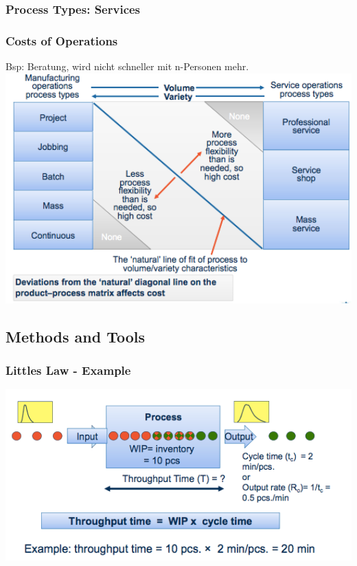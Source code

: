 \subsubsection{Process Types: Services }
\subsubsection{Costs of Operations}
Bsp: Beratung, wird nicht schneller mit n-Personen mehr.\\
\includegraphics[width=1\textwidth]{W04/costofoperations}
\newpage
\subsection{Methods and Tools}
\subsubsection{Little\textquotesingle{}s Law - Example }
\includegraphics[width=1\textwidth]{W04/littleslaw}
